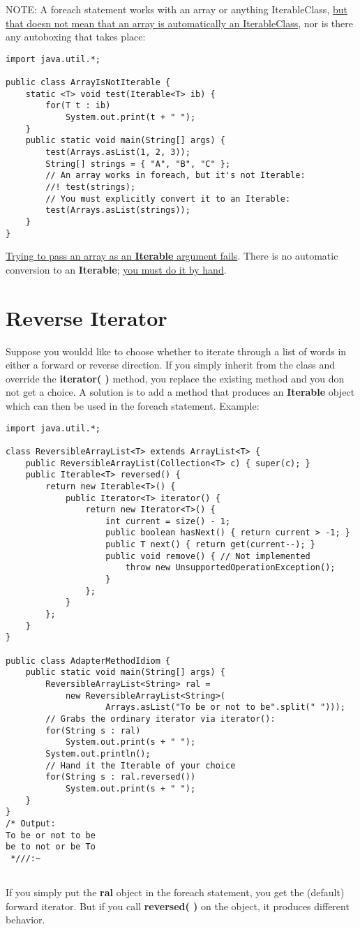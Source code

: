 \documentclass[10pt,letterpaper]{report}
\begin{document}
NOTE: A foreach statement works with an array or anything IterableClass, \underline{but that doesn not mean that an array is automatically an IterableClass}, nor is there any autoboxing that takes place:

\begin{lstlisting}
import java.util.*;

public class ArrayIsNotIterable {
	static <T> void test(Iterable<T> ib) {
		for(T t : ib)
			System.out.print(t + " ");
	}
	public static void main(String[] args) {
		test(Arrays.asList(1, 2, 3));
		String[] strings = { "A", "B", "C" };
		// An array works in foreach, but it's not Iterable:
		//! test(strings);
		// You must explicitly convert it to an Iterable:
		test(Arrays.asList(strings));
	}
}
\end{lstlisting}

\underline{Trying to pass an array as an \textbf{Iterable} argument fails}. There is no automatic conversion to an \textbf{Iterable}; \underline{you must do it by hand}.

\section{Reverse Iterator}

Suppose you wouldd like to choose whether to iterate through a list of words in either a forward or reverse direction. If you simply inherit from the class and override the \textbf{iterator( )} method, you replace the existing method and you don not get a choice. A solution is to add a method that produces an \textbf{Iterable} object which can then be used in the foreach statement.
Example:

\begin{lstlisting}
import java.util.*;

class ReversibleArrayList<T> extends ArrayList<T> {
	public ReversibleArrayList(Collection<T> c) { super(c); }
	public Iterable<T> reversed() {
		return new Iterable<T>() {
			public Iterator<T> iterator() {
				return new Iterator<T>() {
					int current = size() - 1;
					public boolean hasNext() { return current > -1; }
					public T next() { return get(current--); }
					public void remove() { // Not implemented
						throw new UnsupportedOperationException();
					}
				};
			}
		};
	}
}	

public class AdapterMethodIdiom {
	public static void main(String[] args) {
		ReversibleArrayList<String> ral =
			new ReversibleArrayList<String>(
					Arrays.asList("To be or not to be".split(" ")));
		// Grabs the ordinary iterator via iterator():
		for(String s : ral)
			System.out.print(s + " ");
		System.out.println();
		// Hand it the Iterable of your choice
		for(String s : ral.reversed())
			System.out.print(s + " ");
	}
}
/* Output:
To be or not to be
be to not or be To
 *///:~
 
\end{lstlisting}
If you simply put the \textbf{ral} object in the foreach statement, you get the (default) forward iterator. But if you call \textbf{reversed( )} on the object, it produces different behavior.
\end{document}
